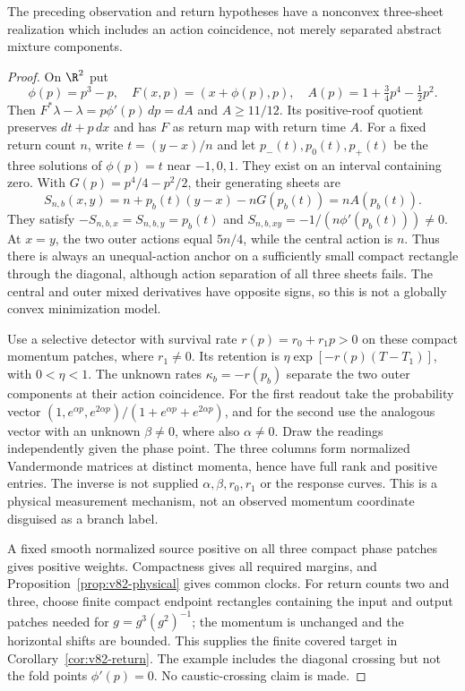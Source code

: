 \begin{proposition}
\label{prop:v82-shear}
The preceding observation and return hypotheses have a nonconvex
three-sheet realization which includes an action coincidence, not merely
separated abstract mixture components.
\end{proposition}
\begin{proof}
On $\R^2$ put
\[
 \phi(p)=p^3-p,\quad F(x,p)=(x+\phi(p),p),\quad
 A(p)=1+\tfrac34p^4-\tfrac12p^2.
\]
Then $F^*\lambda-\lambda=p\phi'(p)\,dp=dA$ and
$A\ge11/12$. Its positive-roof quotient preserves $dt+p\,dx$ and
has $F$ as return map with return time $A$.
For a fixed return count $n$, write $t=(y-x)/n$ and let
$p_-(t),p_0(t),p_+(t)$ be the three solutions of $\phi(p)=t$
near $-1,0,1$. They exist on an interval containing zero. With
$G(p)=p^4/4-p^2/2$, their generating sheets are
\[
 S_{n,b}(x,y)=n+p_b(t)(y-x)-nG(p_b(t))=nA(p_b(t)).
\]
They satisfy $-S_{n,b,x}=S_{n,b,y}=p_b(t)$ and
$S_{n,b,xy}=-1/(n\phi'(p_b(t)))\ne0$. At $x=y$, the two outer
actions equal $5n/4$, while the central action is $n$.
Thus there is always an unequal-action anchor on a sufficiently small
compact rectangle through the diagonal, although action separation of
all three sheets fails. The central and outer mixed derivatives have
opposite signs, so this is not a globally convex minimization model.

Use a selective detector with survival rate $r(p)=r_0+r_1p>0$ on these
compact momentum patches, where $r_1\ne0$. Its retention is
$\eta\exp[-r(p)(T-T_1)]$, with $0<\eta<1$. The unknown rates
$\kappa_b=-r(p_b)$ separate the two outer components at their action
coincidence. For the first readout take the probability vector
$(1,e^{\alpha p},e^{2\alpha p})/(1+e^{\alpha p}+e^{2\alpha p})$,
and for the second use the analogous vector with an unknown
$\beta\ne0$, where also $\alpha\ne0$. Draw the readings independently
given the phase point. The three columns form normalized Vandermonde
matrices at distinct momenta, hence have full rank and positive entries.
The inverse is not supplied $\alpha,\beta,r_0,r_1$ or the response
curves. This is a physical measurement mechanism, not an observed
momentum coordinate disguised as a branch label.

A fixed smooth normalized source positive on all three compact phase
patches gives positive weights. Compactness gives all required margins,
and Proposition~\ref{prop:v82-physical} gives common clocks.
For return counts two and three, choose finite compact endpoint
rectangles containing the input and output patches needed for
$g=g^3(g^2)^{-1}$; the momentum is unchanged and the horizontal shifts
are bounded. This supplies the finite covered target in
Corollary~\ref{cor:v82-return}. The example includes the diagonal
crossing but not the fold points $\phi'(p)=0$. No caustic-crossing
claim is made.
\end{proof}


